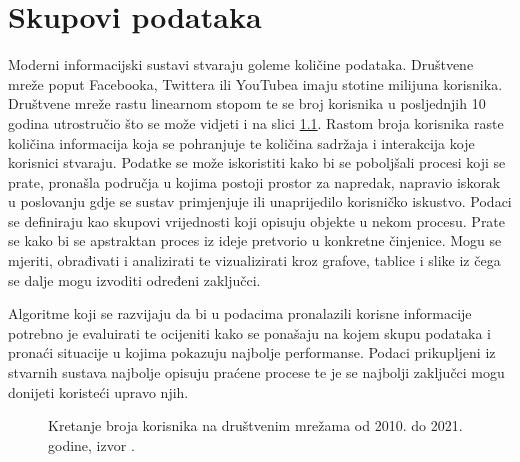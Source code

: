 \chapter{Skupovi podataka}

Moderni informacijski sustavi stvaraju goleme količine podataka. Društvene mreže poput Facebooka, Twittera ili YouTubea imaju stotine milijuna korisnika. Društvene mreže rastu linearnom stopom te se broj korisnika u posljednjih 10 godina utrostručio što se može vidjeti i na slici \ref{fig:users}. Rastom broja korisnika raste količina informacija koja se pohranjuje te količina sadržaja i interakcija koje korisnici stvaraju. Podatke se može iskoristiti kako bi se poboljšali procesi koji se prate, pronašla područja u kojima postoji prostor za napredak, napravio iskorak u poslovanju gdje se sustav primjenjuje ili unaprijedilo korisničko iskustvo. Podaci se definiraju kao skupovi vrijednosti koji opisuju objekte u nekom procesu. Prate se kako bi se apstraktan proces iz ideje pretvorio u konkretne činjenice. Mogu se mjeriti, obrađivati i analizirati te vizualizirati kroz grafove, tablice i slike iz čega se dalje mogu izvoditi određeni zaključci. 


Algoritme koji se razvijaju da bi u podacima pronalazili korisne informacije potrebno je evaluirati te ocijeniti kako se ponašaju na kojem skupu podataka i pronaći situacije u kojima pokazuju najbolje performanse. Podaci prikupljeni iz stvarnih sustava najbolje opisuju praćene procese te je se najbolji zaključci mogu donijeti koristeći upravo njih.

\begin{figure}
	\caption{Kretanje broja korisnika na društvenim mrežama od 2010. do 2021. godine, izvor \cite{usersInWorld}.}
	\label{fig:users}
\end{figure}

